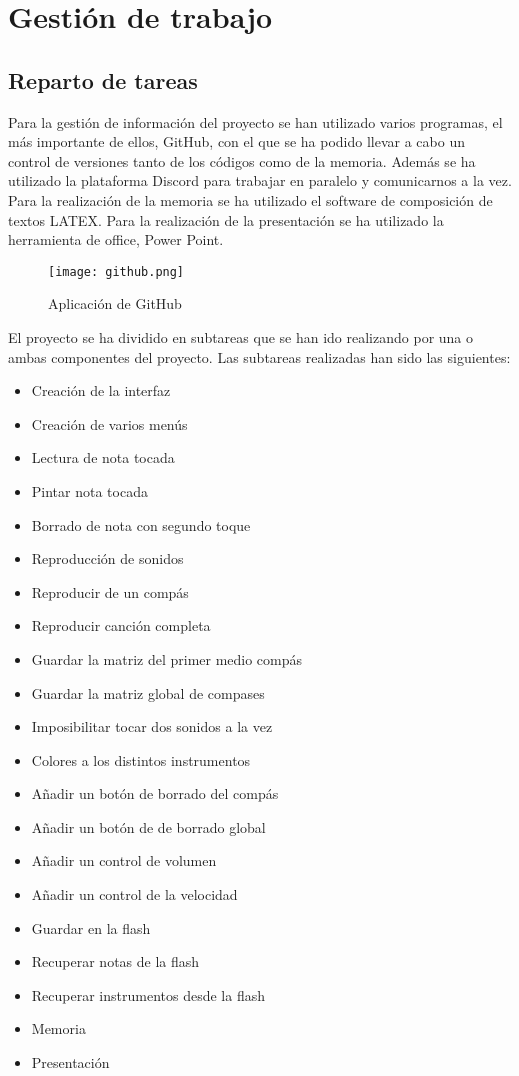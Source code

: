 \documentclass[12pt,a4paper]{article}
\begin{document}
\section{Gestión de trabajo}
\subsection{Reparto de tareas}
Para la gestión de información del proyecto se han utilizado varios programas, el más importante de ellos, GitHub, con el que se ha podido llevar a cabo un control de versiones tanto de los códigos como de la memoria. Además se ha utilizado la plataforma Discord para trabajar en paralelo y comunicarnos a la vez. Para la realización de la memoria se ha utilizado el software de composición de textos LATEX. Para la realización de la presentación se ha utilizado la herramienta de office, Power Point.

\begin{figure}[h!]
\centering
  \texttt{[image: github.png]}
  \caption{Aplicación de GitHub}
  \label{fig:img1}
\end{figure}

\newpage

El proyecto se ha dividido en subtareas que se han ido realizando por una o ambas componentes del proyecto. Las subtareas realizadas han sido las siguientes:

\begin{itemize}
\item Creación de la interfaz
\item Creación de varios menús
\item Lectura de nota tocada
\item Pintar nota tocada
\item Borrado de nota con segundo toque 
\item Reproducción de sonidos
\item Reproducir de un compás
\item Reproducir canción completa
\item Guardar la matriz del primer medio compás 
\item Guardar la matriz global de compases
\item Imposibilitar tocar dos sonidos a la vez 
\item Colores a los distintos instrumentos
\item Añadir un botón de borrado del compás
\item Añadir un botón de de borrado global 
\item Añadir un control de volumen
\item Añadir un control de la velocidad
\item Guardar en la flash
\item Recuperar notas de la flash
\item Recuperar instrumentos desde la flash
\item Memoria
\item Presentación
\end{itemize}
\end{document}
